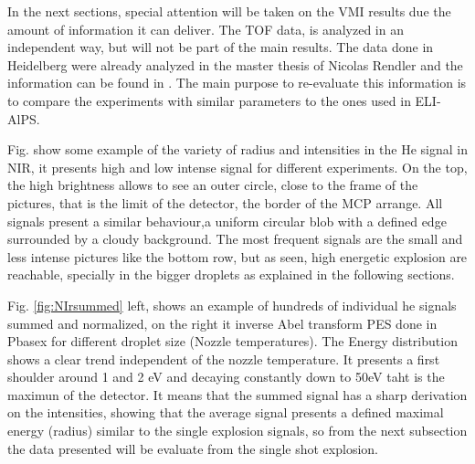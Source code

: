In the next sections, special attention will be taken on the VMI results due the amount of information it can deliver. The TOF data, is analyzed in an independent way, but will not be part of the main results. The data done in Heidelberg were already analyzed in the master thesis of Nicolas Rendler and the information can be found in \cite{rendler_einzelschuss_2017}. The main purpose to re-evaluate this information is to compare the experiments with similar parameters to the ones used in ELI-AlPS.

Fig. \label{fig:NIRsample}  show some example of the variety of radius and intensities in the He signal in NIR, it presents high and low intense signal for different experiments. On the top, the high brightness allows to see an outer circle, close to the frame of the pictures, that is the limit of the detector, the border of the MCP arrange. All signals present a similar behaviour,a uniform circular blob with a defined edge surrounded by a cloudy background. The most frequent signals are the small and less intense pictures like the bottom row, but as seen, high energetic explosion are reachable, specially in the bigger droplets as explained in the following sections. 

Fig. \ref{fig:NIrsummed} left, shows an example of hundreds of individual he signals summed and normalized, on the right it  inverse Abel transform PES done in Pbasex for different droplet size (Nozzle temperatures). The Energy distribution shows a clear trend independent of the nozzle temperature. It presents a first shoulder around 1 and 2 eV and decaying constantly down to 50eV taht is the maximun of the detector. It means that the summed signal has a sharp derivation on the intensities, showing that the average signal presents a defined maximal energy (radius) similar to the single  explosion signals, so from the next subsection  the data presented will be evaluate from the single shot explosion.

